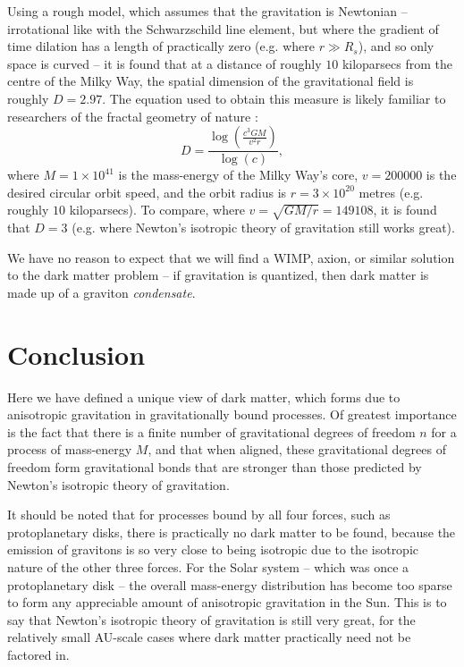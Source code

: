 \documentclass[12pt]{article}
\begin{document}
{Using a rough model, which assumes that the gravitation is Newtonian -- irrotational like with the Schwarzschild line element, but where the gradient of time dilation has a length of practically zero (e.g. where $r \gg R_s$), and so only space is curved -- it is found that at a distance of roughly $10$ kiloparsecs from the centre of the Milky Way, the spatial dimension of the gravitational field is roughly $D = 2.97$.
The equation used to obtain this measure is likely familiar to researchers of the fractal geometry of nature \cite{mandelbrot}:
\begin{equation}
D = \frac{ \log\left(\frac{c^3 G M}{ v^2 r } \right)} { \log(c) },
\end{equation}
where $M = 1 \times 10^{41}$ is the mass-energy of the Milky Way's core, $v = 200000$ is the desired circular orbit speed, and the orbit radius is $r = 3 \times 10^{20}$ metres (e.g. roughly $10$ kiloparsecs).
To compare, where $v = \sqrt{GM/r} = 149108$, it is found that $D = 3$ (e.g. where Newton's isotropic theory of gravitation still works great).

We have no reason to expect that we will find a WIMP, axion, or similar solution \cite{berger, aalbers, quiskamp, haipeng, hui, ackerman} to the dark matter problem -- if gravitation is quantized, then dark matter is made up of a graviton {\textit{condensate}}.






\section{Conclusion}

Here we have defined a unique view of dark matter, which forms due to anisotropic gravitation in gravitationally bound processes.
Of greatest importance is the fact that there is a finite number of gravitational degrees of freedom $n$ for a process of mass-energy $M$, and that when aligned, these gravitational degrees of freedom form gravitational bonds that are stronger than those predicted by Newton's isotropic theory of gravitation.

It should be noted that for processes bound by all four forces, such as protoplanetary disks, there is practically no dark matter to be found, because the emission of gravitons is so very close to being isotropic due to the isotropic nature of the other three forces.
For the Solar system -- which was once a protoplanetary disk -- the overall mass-energy distribution has become too sparse to form any appreciable amount of anisotropic gravitation in the Sun.
This is to say that Newton's isotropic theory of gravitation is still very great, for the relatively small AU-scale cases where dark matter practically need not be factored in.

}
\end{document}
